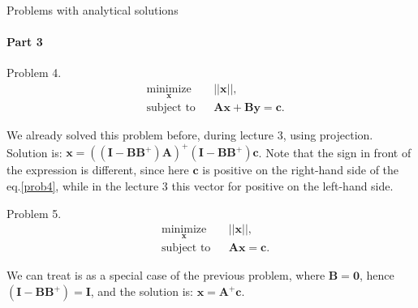 \documentclass{beamer}
\begin{document}
\begin{frame}{Problems with analytical solutions}
\framesubtitle{Part 3}
\begin{flushleft}

Problem 4. 
%
\begin{equation}
\begin{aligned}
& \underset{\mathbf{x}}{\text{minimize}}
& & || \mathbf{x} ||, \\
& \text{subject to}
& & \mathbf{A} \mathbf{x} + \mathbf{B} \mathbf{y} = \mathbf{c}.
\end{aligned}
\label{prob4}
\end{equation}

We already solved this problem before, during lecture 3, using projection. Solution is: $\mathbf{x} = ((\mathbf{I} - \mathbf{B}\mathbf{B}^+) \mathbf{A})^+(\mathbf{I} - \mathbf{B}\mathbf{B}^+) \mathbf{c}$. Note that the sign in front of the expression is different, since here $\mathbf{c}$ is positive on the right-hand side of the eq.\ref{prob4}, while in the lecture 3 this vector for positive on the left-hand side. 

\bigskip

Problem 5. 
%
\begin{equation}
\begin{aligned}
& \underset{\mathbf{x}}{\text{minimize}}
& & || \mathbf{x} ||, \\
& \text{subject to}
& & \mathbf{A} \mathbf{x} = \mathbf{c}.
\end{aligned}
\end{equation}

We can treat is as a special case of the previous problem, where $\mathbf{B} = \mathbf{0}$, hence $(\mathbf{I} - \mathbf{B}\mathbf{B}^+) = \mathbf{I}$, and the solution is: $\mathbf{x} = \mathbf{A}^+\mathbf{c}$.

\end{flushleft}
\end{frame}
\end{document}
